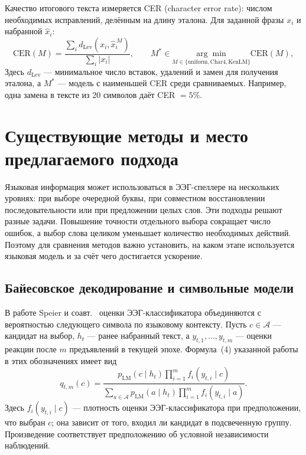 \documentclass[11pt,a4paper]{article}
\begin{document}
Качество итогового текста измеряется CER (character error rate): числом необходимых исправлений, делённым на длину эталона. Для заданной фразы $x_i$ и набранной $\hat x_i$:
\begin{equation}
 \mathrm{CER}(M)=\frac{\sum_i d_{\mathrm{Lev}}(x_i,\hat x_i^{\,M})}{\sum_i|x_i|},
 \qquad M^*\in\underset{M\in\{\mathrm{uniform,Char4,KenLM}\}}{\arg\min}\mathrm{CER}(M),
\end{equation}
Здесь $d_{\mathrm{Lev}}$ --- минимальное число вставок, удалений и замен для получения эталона, а $M^*$ --- модель с наименьшей CER среди сравниваемых. Например, одна замена в тексте из 20 символов даёт CER $=5\%$.

\section{Существующие методы и место предлагаемого подхода}

Языковая информация может использоваться в ЭЭГ-спеллере
на нескольких уровнях: при выборе очередной буквы,
при совместном восстановлении последовательности
или при предложении целых слов. Эти подходы решают
разные задачи. Повышение точности отдельного выбора
сокращает число ошибок, а выбор слова целиком уменьшает
количество необходимых действий. Поэтому для сравнения
методов важно установить, на каком этапе используется
языковая модель и за счёт чего достигается ускорение.

\subsection{Байесовское декодирование и символьные модели}

В работе Speier и соавт.~\citep{p22156110}
оценки ЭЭГ-классификатора объединяются с вероятностью
следующего символа по языковому контексту.
Пусть $c\in\mathcal A$ --- кандидат на выбор,
$h_t$ --- ранее набранный текст,
а $y_{t,1},\ldots,y_{t,m}$ --- оценки реакции
после $m$ предъявлений в текущей эпохе.
Формула~(4) указанной работы в этих обозначениях имеет вид
\begin{equation}\label{eq:review-bayes}
q_{t,m}(c)=
\frac{
p_{\mathrm{LM}}(c\mid h_t)
\prod_{i=1}^{m} f_i(y_{t,i}\mid c)
}{
\displaystyle
\sum_{a\in\mathcal A}
p_{\mathrm{LM}}(a\mid h_t)
\prod_{i=1}^{m} f_i(y_{t,i}\mid a)
}.
\end{equation}
Здесь $f_i(y_{t,i}\mid c)$ --- плотность оценки
ЭЭГ-классификатора при предположении, что выбран $c$;
она зависит от того, входил ли кандидат в подсвеченную
группу. Произведение соответствует предположению
об условной независимости наблюдений.
\end{document}

